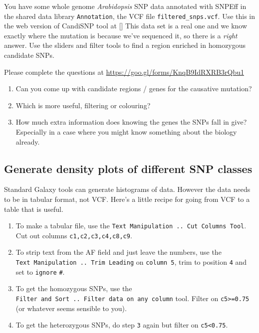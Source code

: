 \documentclass[12pt,]{book}
\providecommand{\tightlist}{%
  \setlength{\itemsep}{0pt}\setlength{\parskip}{0pt}}
\theoremstyle{definition}
\theoremstyle{definition}
\theoremstyle{remark}
\begin{document}
You have some whole genome \emph{Arabidopsis} SNP data annotated with
SNPEff in the shared data library \texttt{Annotation}, the VCF file
\texttt{filtered\_snps.vcf}. Use this in the web version of CandiSNP
tool at {[}{]} This data set is a real one and we know exactly where the
mutation is because we've sequenced it, so there is a \emph{right}
answer. Use the sliders and filter tools to find a region enriched in
homozygous candidate SNPs.

Please complete the questions at
\url{https://goo.gl/forms/KnqB9IdRXRB3rQbu1}

\begin{enumerate}
\def\labelenumi{\arabic{enumi}.}
\tightlist
\item
  Can you come up with candidate regions / genes for the causative
  mutation?
\item
  Which is more useful, filtering or colouring?
\item
  How much extra information does knowing the genes the SNPs fall in
  give? Especially in a case where you might know something about the
  biology already.
\end{enumerate}

\subsection{Generate density plots of different SNP
classes}\label{generate-density-plots-of-different-snp-classes}

Standard Galaxy tools can generate histograms of data. However the data
needs to be in tabular format, not VCF. Here's a little recipe for going
from VCF to a table that is useful.

\begin{enumerate}
\def\labelenumi{\arabic{enumi}.}
\tightlist
\item
  To make a tabular file, use the
  \texttt{Text\ Manipulation\ ..\ Cut\ Columns\ Tool}. Cut out columns
  \texttt{c1,c2,c3,c4,c8,c9}.
\item
  To strip text from the AF field and just leave the numbers, use the
  \texttt{Text\ Manipulation\ ..\ Trim\ Leading} on \texttt{column\ 5},
  trim to position \texttt{4} and set to \texttt{ignore} \texttt{\#}.
\item
  To get the homozygous SNPs, use the
  \texttt{Filter\ and\ Sort\ ..\ Filter\ data\ on\ any\ column} tool.
  Filter on \texttt{c5\textgreater{}=0.75} (or whatever seems sensible
  to you).
\item
  To get the heterozygous SNPs, do step \texttt{3} again but filter on
  \texttt{c5\textless{}0.75}.
\end{enumerate}
\end{document}
